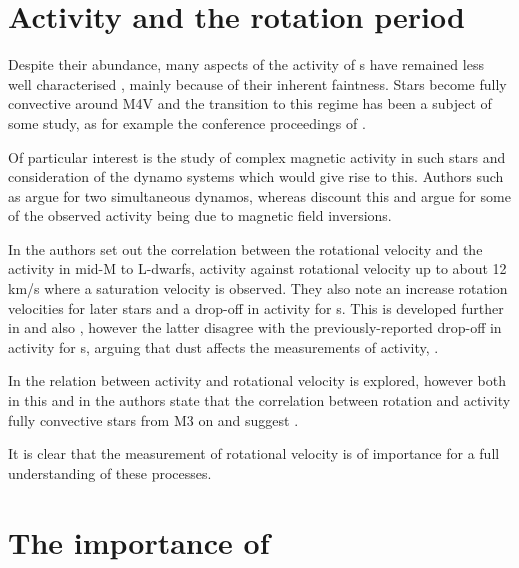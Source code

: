 \section{Activity and the rotation period}
\protect\label{section:introrotation}

Despite their abundance, many aspects of the activity of \rdwarf s have remained less well characterised
, mainly because of their inherent faintness. Stars become fully
convective  around M4V and the transition to this regime has been a subject of some study, as for
example the conference proceedings of \citet{stassun11}.

Of particular interest is the study of complex magnetic activity in such stars and consideration of the dynamo systems
which would give rise to this. Authors such as \citet{morin11} argue for two simultaneous dynamos, whereas
\citet{kitchatinov14} discount this and argue for some of the observed activity being due to magnetic field inversions.

In \citet{mohanty03} the authors set out the correlation between the  rotational velocity
{\vsini} and the activity in mid-M to L-dwarfs,  activity against rotational velocity up to about
12 km/s where a saturation velocity is observed. They also note an increase  rotation velocities for
later stars and a drop-off in activity for \ldwarf s. This is developed further in \citet{reiners08} and also
\citet{schmidt14}, however the latter disagree with the previously-reported drop-off in activity for \ldwarf s, arguing
that dust affects the measurements of activity, .

In \citet{mohanty02} the relation between activity and rotational velocity is explored, however both in this and in
\citet{mohanty03} the authors state that the correlation between rotation and activity  
fully convective stars from M3 on and suggest .

It is clear that the measurement of rotational velocity is of importance for a full understanding of these processes.

\section{The importance of {\ha}}
\protect\label{section:intohalpha}

